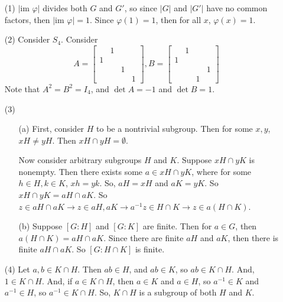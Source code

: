 %
%
\begin{itemize}
\item[(1)]
$|\text{im }\varphi|$ divides both $G$ and $G'$, so since $|G|$ and $|G'|$ have no common factors, then $|\text{im }\varphi| = 1$. Since $\varphi(1) = 1$, then for all $x$, $\varphi(x) = 1$.
\item[(2)] Consider $S_4$. Consider
$$A = \begin{bmatrix}
& 1 \\
1 \\
& & 1 \\
& & & 1
\end{bmatrix}, B = \begin{bmatrix}
& 1 \\
1 \\
& & & 1 \\
& & 1
\end{bmatrix}$$
Note that $A^2 = B^2 = I_4$, and $\det A = -1$ and $\det B = 1$.
\item[(3)]
\begin{itemize}
\item[(a)]
First, consider $H$ to be a nontrivial subgroup. Then for some $x, y$, $xH \neq yH$. Then $xH \cap yH = \emptyset$.

Now consider arbitrary subgroups $H$ and $K$. Suppose $xH \cap yK$ is nonempty. Then there exists some $a \in xH \cap yK$, where for some $h \in H, k \in K$, $xh = yk$. So, $aH = xH$ and $aK = yK$. So $xH \cap yK = aH \cap aK$. So $z \in aH \cap aK \rightarrow z \in aH, aK \rightarrow a^{-1}z \in H \cap K \rightarrow z \in a(H \cap K)$.
\item[(b)]
Suppose $[G:H]$ and $[G:K]$ are finite. Then for $a \in G$, then $a(H \cap K) = aH \cap aK$. Since there are finite $aH$ and $aK$, then there is finite $aH \cap aK$. So $[G:H\cap K]$ is finite.
\end{itemize}
\item[(4)]
Let $a, b \in K \cap H$. Then $ab \in H$, and $ab \in K$, so $ab \in K \cap H$. And, $1 \in K \cap H$. And, if $a \in K \cap H$, then $a \in K$ and $a \in H$, so $a^{-1} \in K$ and $a^{-1} \in H$, so $a^{-1} \in K \cap H$. So, $K \cap H$ is a subgroup of both $H$ and $K$.


\end{itemize}

